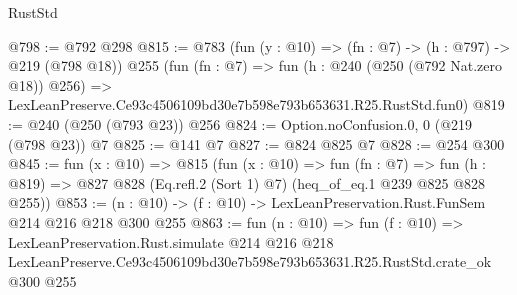 \begin{lexlean}{RustStd}
\begin{coremodule}
@798 := @792 @298
@815 := @783
    (fun (y : @10) => (fn : @7) -> (h : @797) -> @219 (@798 @18))
    @255
    (fun (fn : @7) =>
    fun (h : @240 (@250 (@792 Nat.zero @18)) @256) =>
    LexLeanPreserve.Ce93c4506109bd30e7b598e793b653631.R25.RustStd.fun0)
@819 := @240 (@250 (@793 @23)) @256
@824 := Option.noConfusion.{0, 0} (@219 (@798 @23)) @7
@825 := @141 @7
@827 := @824 @825 @7
@828 := @254 @300
@845 := fun (x : @10) =>
  @815
    (fun (x : @10) =>
    fun (fn : @7) =>
    fun (h : @819) => @827 @828 (Eq.refl.{2} (Sort 1) @7) (heq_of_eq.{1} @239 @825 @828 @255))
@853 := (n : @10) -> (f : @10) -> LexLeanPreservation.Rust.FunSem @214 @216 @218 @300 @255
@863 := fun (n : @10) =>
  fun (f : @10) =>
  LexLeanPreservation.Rust.simulate
    @214
    @216
    @218
    LexLeanPreserve.Ce93c4506109bd30e7b598e793b653631.R25.RustStd.crate_ok
    @300
    @255
\end{coremodule}
\end{lexlean}
